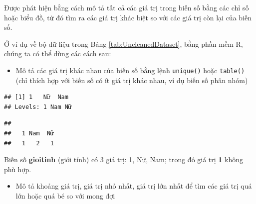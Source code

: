 \documentclass[]{tufte-book}
\newenvironment{Shaded}{}{}
\newcommand{\KeywordTok}[1]{\textcolor[rgb]{0.00,0.44,0.13}{\textbf{#1}}}
\newcommand{\NormalTok}[1]{#1}
\newcommand{\OperatorTok}[1]{\textcolor[rgb]{0.40,0.40,0.40}{#1}}
\providecommand{\tightlist}{%
  \setlength{\itemsep}{0pt}\setlength{\parskip}{0pt}}
\begin{document}
Được phát hiện bằng cách mô tả tất cả các giá trị trong biến số bằng các chỉ số hoặc biểu đồ, từ đó tìm ra các giá trị khác biệt so với các giá trị còn lại của biến số.

Ở ví dụ về bộ dữ liệu trong Bảng \ref{tab:UncleanedDataset}, bằng phần mềm R, chúng ta có thể dùng các cách sau:

\begin{itemize}
\tightlist
\item
  Mô tả các giá trị khác nhau của biến số bằng lệnh \texttt{unique()} hoặc \texttt{table()} (chỉ thích hợp với biến số có ít giá trị khác nhau, ví dụ biến số phân nhóm)
\end{itemize}

\begin{Shaded}
\end{Shaded}

\begin{verbatim}
## [1] 1   Nữ  Nam
## Levels: 1 Nam Nữ
\end{verbatim}

\begin{Shaded}
\end{Shaded}

\begin{verbatim}
## 
##   1 Nam  Nữ 
##   1   2   1
\end{verbatim}

Biến số \textbf{gioitinh} (giới tính) có 3 giá trị: 1, Nữ, Nam; trong đó giá trị \textbf{1} không phù hợp.

\begin{itemize}
\tightlist
\item
  Mô tả khoảng giá trị, giá trị nhỏ nhất, giá trị lớn nhất để tìm các giá trị quá lớn hoặc quá bé so với mong đợi
\end{itemize}

\begin{Shaded}
\end{Shaded}
\end{document}
